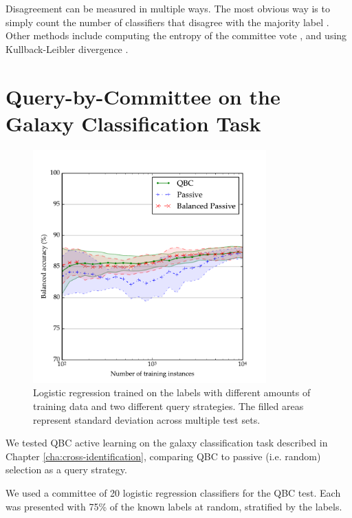         Disagreement can be measured in multiple ways. The most obvious way is
        to simply count the number of classifiers that disagree with the
        majority label \citep{seung92}. Other methods include computing the
        entropy of the committee vote \citep{mccallum98, dagan95}, and using
        Kullback-Leibler divergence \citep{mccallum98}.

\section{Query-by-Committee on the Galaxy Classification Task}
\label{sec:rgz-qbc}

    \begin{figure}
        \centering
        \includegraphics[width=0.8\textwidth]
            {images/experiments/rgz_qbc.pdf}
        \caption{Logistic regression trained on the \citeauthor{norris06}
            labels with different amounts of training data and two different
            query strategies. The filled areas represent standard deviation
            across multiple test sets.}
        \label{fig:rgz-qbc}
    \end{figure}

    We tested QBC active learning on the galaxy classification task described in
    Chapter \ref{cha:cross-identification}, comparing QBC to passive (i.e.
    random) selection as a query strategy.

    We used a committee of 20 logistic regression classifiers for the QBC test.
    Each was presented with 75\% of the known labels at random, stratified by
    the labels.


